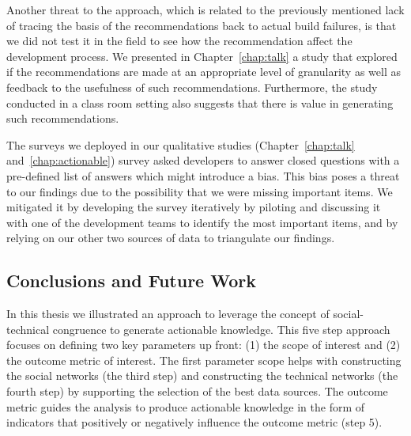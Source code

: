 
Another threat to the approach, which is related to the previously mentioned lack of tracing the basis of the recommendations back to actual build failures, is that we did not test it in the field to see how the recommendation affect the development process.
We presented in Chapter~\ref{chap:talk} a study that explored if the recommendations are made at an appropriate level of granularity as well as feedback to the usefulness of such recommendations.
Furthermore, the study conducted in a class room setting also suggests that there is value in generating such recommendations.

The surveys we deployed in our qualitative studies (Chapter~\ref{chap:talk} and~\ref{chap:actionable}) survey asked developers to answer closed questions with a pre-defined list of answers which might introduce a bias.
This bias poses a threat to our findings due to the possibility that we were missing important items.
We mitigated it by developing the survey iteratively by piloting and discussing it with one of the development teams to identify the most important items, and by relying on our other two sources of data to triangulate our findings.











\subsection{Conclusions and Future Work}
\label{ch:dis:con}
In this thesis we illustrated an approach to leverage the concept of social-technical congruence to generate actionable knowledge.
This five step approach focuses on defining two key parameters up front: (1) the scope of interest and (2) the outcome metric of interest.
The first parameter scope helps with constructing the social networks (the third step) and constructing the technical networks (the fourth step) by supporting the selection of the best data sources.
The outcome metric guides the analysis to produce actionable knowledge in the form of indicators that positively or negatively influence the outcome metric (step 5). 

